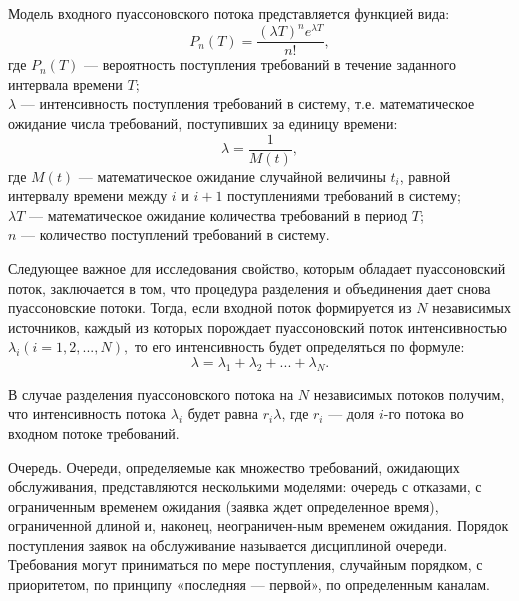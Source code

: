 Модель входного пуассоновского потока представляется функцией вида:
\begin{equation}\label{10-1}
P_n(T) = \dfrac{(\lambda T)^ne^{\lambda T}}{n!},
\end{equation}
где $ P_n(T)  $ --- вероятность поступления требований в течение заданного интервала времени $T$; \\
$\lambda$ --- интенсивность поступления требований в систему, т.е. математическое ожидание числа требований, поступивших за единицу времени:
\begin{equation}\label{10-2}
\lambda =  \dfrac{1}{M(t)},
\end{equation}
где $M(t)$ --- математическое ожидание случайной величины $t_i$, равной интервалу времени между $i$ и $i + 1$ поступлениями требований в систему; \\
$\lambda T$ --- математическое ожидание количества требований в период $T$; \\
$n$ --- количество поступлений требований в систему.

Следующее важное для исследования свойство, которым обладает пуассоновский поток, заключается в том, что процедура разделения и объединения дает снова пуассоновские потоки. Тогда, если входной поток формируется из $N$ независимых источников, каждый из которых порождает пуассоновский поток интенсивностью $\lambda_i (i=1,2,..., N),$ то его интенсивность будет определяться по формуле:
\begin{equation}\label{10-3}
\lambda = \lambda_1 + \lambda_2 + ... + \lambda_N.
\end{equation}

В случае разделения пуассоновского потока на $ N $ независимых потоков получим, что интенсивность потока $\lambda_i$ будет равна $r_i \lambda$, где $r_i$ --- доля $i$-го потока во входном потоке требований.

Очередь. Очереди, определяемые как множество требований, ожидающих обслуживания, представляются несколькими моделями: очередь с отказами, с ограниченным временем ожидания (заявка ждет определенное время), ограниченной длиной и, наконец, неограничен-ным временем ожидания. Порядок поступления заявок на обслуживание называется дисциплиной очереди. Требования могут приниматься по мере поступления, случайным порядком, с приоритетом, по принципу «последняя --- первой», по определенным каналам.

